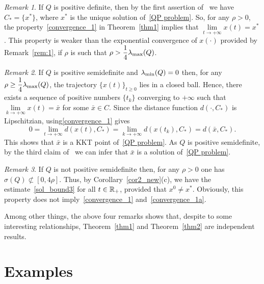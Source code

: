\documentclass[11pt]{article}
\theoremstyle{definition}
\theoremstyle{remark}
\newtheorem{remark}{Remark}
\def\R{\Bbb R}
\begin{document}
\begin{remark}\label{rem:2}\rm
If $Q$ is positive definite, then by the first assertion of~\cite[Theorem~4.4]{lty05} we have $C_*=\{x^*\}$, where $x^*$ is the unique solution of~\eqref{QP problem}. So, for any $\rho >0$, the property~\eqref{convergence_1} in Theorem~\ref{thm1} implies that $\lim\limits_{t\to+\infty} x(t)=x^*$. This property is weaker than the exponential convergence of $x(\cdot)$ provided by  Remark~\ref{rem:1}, if $\rho$ is such that $\rho>\dfrac{1}{4}\lambda_{\rm max} (Q)$.
\end{remark}

\begin{remark}\label{rem:3}\rm
If $Q$ is positive semidefinite and $\lambda_{\rm min}(Q)=0$ then, for any  $\rho\geq\dfrac{1}{4}\lambda_{\rm max} (Q)$, the trajectory $\{x(t)\}_{t\geq 0}$ lies in a closed ball. Hence, there exists a sequence of positive numbers $\{t_k\}$ converging to $+\infty$ such that $\lim\limits_{k\to+\infty} x(t)=\bar x$ for some $\bar x \in C$. Since the distance function $d(\cdot, C_*)$ is Lipschitzian, using\eqref{convergence_1} gives
$$0=\lim\limits_{t\to +\infty} d(x(t),C_*) = \lim\limits_{k\to +\infty} d(x(t_k),C_*)= d(\bar x,C_*).$$
This shows that $\bar x$ is a KKT point of~\eqref{QP problem}. As $Q$ is positive semidefinite, by the third claim of~\cite[Theorem~4.4]{lty05} we can infer that $\bar x$ is a solution of~\eqref{QP problem}. 
\end{remark}

\begin{remark}\label{rem:4}\rm
	If $Q$ is not positive semidefinite then, for any $\rho >0$ one has $\sigma(Q)\not\subset[0,4\rho]$. Thus, by Corollary~\ref{cor2_new}(c), we have the estimate~\eqref{sol_bound3} for all $t\in\R_+$, provided that $x^0\neq x^*$. Obviously, this property does not imply~\eqref{convergence_1} and~\eqref{convergence_1a}.
\end{remark}

Among other things, the above four remarks shows that, despite to some interesting relationships, Theorem~\ref{thm1} and Theorem~\ref{thm2} are independent results.

\section{Examples}\label{Sect-4}
\end{document}
